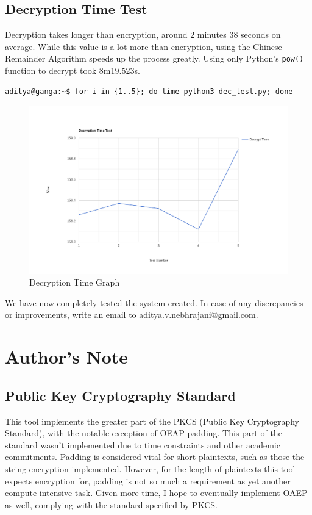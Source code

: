 \documentclass[titlepage]{article}
\begin{document}
\subsection{Decryption Time Test}
Decryption takes longer than encryption, around 2 minutes 38 seconds on average. While this value is
a lot more than encryption, using the Chinese Remainder Algorithm speeds up the process greatly.
Using only Python's \texttt{pow()} function to decrypt took 8m19.523s.

\begin{verbatim}
aditya@ganga:~$ for i in {1..5}; do time python3 dec_test.py; done
\end{verbatim}


\begin{figure}[H]
  \centering
  \includegraphics[scale=0.25]{dg.png}
  \caption{Decryption Time Graph}
\end{figure}
We have now completely tested the system created. In case of any discrepancies or improvements,
write an email to \href{mailto: aditya.v.nebhrajani@gmail.com}{aditya.v.nebhrajani@gmail.com}.

\cleardoublepage

\section{Author's Note}
\subsection{Public Key Cryptography Standard}
This tool implements the greater part of the PKCS (Public Key Cryptography Standard), with the
notable exception of OEAP padding. This part of the standard wasn't implemented due to time
constraints and other academic commitments. Padding is considered vital for short plaintexts, such
as those the string encryption implemented. However, for the length of plaintexts this tool
expects encryption for, padding is not so much a requirement as yet another compute-intensive task.
Given more time, I hope to eventually implement OAEP as well, complying with the standard
specified by PKCS.
\end{document}

